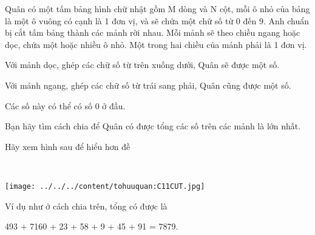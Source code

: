 Quân có một tấm bảng hình chữ nhật gồm M dòng và N cột, mỗi ô nhỏ của bảng là một ô vuông có cạnh là 1 đơn vị, và sẽ chứa một chữ số từ 0 đến 9. Anh chuẩn bị cắt tấm bảng thành các mảnh rời nhau. Mỗi mảnh sẽ theo chiều ngang hoặc dọc, chứa một hoặc nhiều ô nhỏ. Một trong hai chiều của mảnh phải là 1 đơn vị.

Với mảnh dọc, ghép các chữ số từ trên xuống dưới, Quân sẽ được một số.


Với mảnh ngang, ghép các chữ số từ trái sang phải, Quân cũng được một số.


Các số này có thể có số 0 ở đầu.

Bạn hãy tìm cách chia để Quân có được tổng các số trên các mảnh là lớn nhất.

Hãy xem hình sau để hiểu hơn đề

 


\texttt{[image: ../../../content/tohuuquan:C11CUT.jpg]}

Ví dụ như ở cách chia trên, tổng có được là


493 + 7160 + 23 + 58 + 9 + 45 + 91 = 7879.